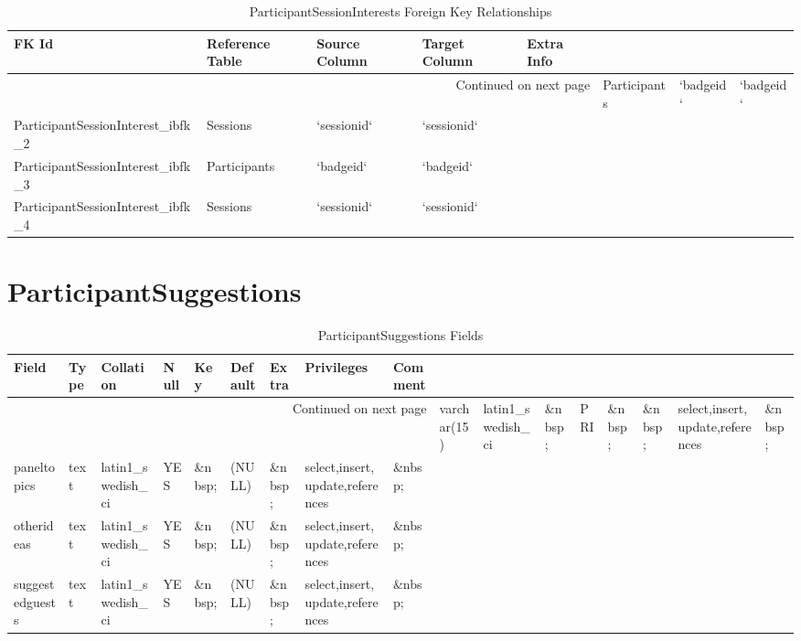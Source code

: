 \documentclass[tablesignature,landscape]{scrartcl}
\begin{document}
\begin{longtable}{|l|l|l|l|l|}
\caption{ParticipantSessionInterests Foreign Key Relationships} \label{tbl:participantsessioninterestsfkr}\\
\hline
 FK Id                                    &  Reference Table  &  Source Column  &  Target Column  &  Extra Info \\
\hline
\endhead
\hline\multicolumn{5}{r}{Continued on next page}\
\endfoot
\endlastfoot
\hline
 ParticipantSessionInterest\_{}ibfk\_{}1  &  Participants     &  `badgeid`      &  `badgeid`      &              \\
 ParticipantSessionInterest\_{}ibfk\_{}2  &  Sessions         &  `sessionid`    &  `sessionid`    &              \\
 ParticipantSessionInterest\_{}ibfk\_{}3  &  Participants     &  `badgeid`      &  `badgeid`      &              \\
 ParticipantSessionInterest\_{}ibfk\_{}4  &  Sessions         &  `sessionid`    &  `sessionid`    &              \\
\hline
\end{longtable}
\section{ParticipantSuggestions}
\label{sec-12}


\begin{longtable}{|l|l|l|l|l|l|l|l|l|}
\caption{ParticipantSuggestions Fields} \label{tbl:participantsuggestionsfields}\\
\hline
 Field            &  Type         &  Collation                &  Null     &  Key      &  Default  &  Extra    &  Privileges                       &  Comment \\
\hline
\endhead
\hline\multicolumn{9}{r}{Continued on next page}\
\endfoot
\endlastfoot
\hline
 badgeid          &  varchar(15)  &  latin1\_{}swedish\_{}ci  &  \&nbsp;  &  PRI      &  \&nbsp;  &  \&nbsp;  &  select,insert,update,references  &  \&nbsp;  \\
 paneltopics      &  text         &  latin1\_{}swedish\_{}ci  &  YES      &  \&nbsp;  &  (NULL)   &  \&nbsp;  &  select,insert,update,references  &  \&nbsp;  \\
 otherideas       &  text         &  latin1\_{}swedish\_{}ci  &  YES      &  \&nbsp;  &  (NULL)   &  \&nbsp;  &  select,insert,update,references  &  \&nbsp;  \\
 suggestedguests  &  text         &  latin1\_{}swedish\_{}ci  &  YES      &  \&nbsp;  &  (NULL)   &  \&nbsp;  &  select,insert,update,references  &  \&nbsp;  \\
\hline
\end{longtable}
\end{document}
